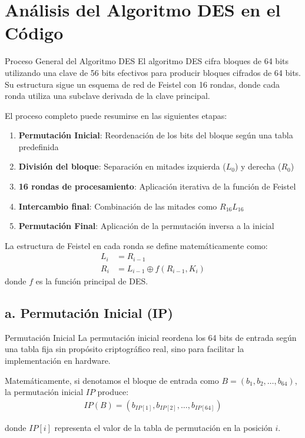 \section{Análisis del Algoritmo DES en el Código}

\begin{cryptomethod}{Proceso General del Algoritmo DES}
El algoritmo DES cifra bloques de 64 bits utilizando una clave de 56 bits efectivos para producir bloques cifrados de 64 bits. Su estructura sigue un esquema de red de Feistel con 16 rondas, donde cada ronda utiliza una subclave derivada de la clave principal.

El proceso completo puede resumirse en las siguientes etapas:
\begin{enumerate}
    \item \textbf{Permutación Inicial}: Reordenación de los bits del bloque según una tabla predefinida
    \item \textbf{División del bloque}: Separación en mitades izquierda ($L_0$) y derecha ($R_0$)
    \item \textbf{16 rondas de procesamiento}: Aplicación iterativa de la función de Feistel
    \item \textbf{Intercambio final}: Combinación de las mitades como $R_{16}L_{16}$
    \item \textbf{Permutación Final}: Aplicación de la permutación inversa a la inicial
\end{enumerate}

La estructura de Feistel en cada ronda se define matemáticamente como:
\begin{align}
    L_i &= R_{i-1} \\
    R_i &= L_{i-1} \oplus f(R_{i-1}, K_i)
\end{align}
donde $f$ es la función principal de DES.
\end{cryptomethod}

\subsection{a. Permutación Inicial (IP)}

\begin{cryptoanalysis}{Permutación Inicial}
La permutación inicial reordena los 64 bits de entrada según una tabla fija sin propósito criptográfico real, sino para facilitar la implementación en hardware.

Matemáticamente, si denotamos el bloque de entrada como $B = (b_1, b_2, \ldots, b_{64})$, la permutación inicial $IP$ produce:
\begin{align}
IP(B) = (b_{IP[1]}, b_{IP[2]}, \ldots, b_{IP[64]})
\end{align}

donde $IP[i]$ representa el valor de la tabla de permutación en la posición $i$.
\end{cryptoanalysis}


